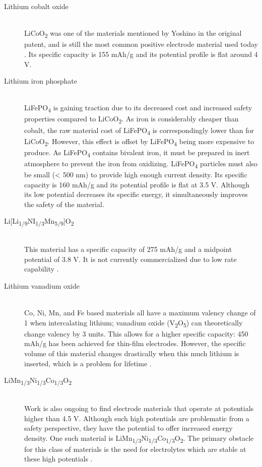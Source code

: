 \documentclass[12pt]{article} %
\begin{document}
\begin{description} %

\item[Lithium cobalt oxide] \hfill \\
LiCoO\textsubscript{2} was one of the materials mentioned by Yoshino in the original patent, and is still the most common positive electrode material used today \cite{yoshino_secondary_1987}.
Its specific capacity is 155 mAh/g and its potential profile is flat around 4 V.

\item[Lithium iron phosphate] \hfill \\
LiFePO\textsubscript{4} is gaining traction due to its decreased cost and increased safety properties compared to LiCoO\textsubscript{2}.
As iron is considerably cheaper than cobalt, the raw material cost of LiFePO\textsubscript{4} is correspondingly lower than for LiCoO\textsubscript{2}.
However, this effect is offset by LiFePO\textsubscript{4} being more expensive to produce.
As LiFePO\textsubscript{4} contains bivalent iron, it must be prepared in inert atmosphere to prevent the iron from oxidizing.
LiFePO\textsubscript{4} particles must also be small (< 500 nm) to provide high enough current density.
Its specific capacity is 160 mAh/g and its potential profile is flat at 3.5 V.
Although its low potential decreases its specific energy, it simultaneously improves the safety of the material.

\item[{Li[Li\textsubscript{1/9}NI\textsubscript{1/3}Mn\textsubscript{5/9}]O\textsubscript{2}}] \hfill \\
This material has a specific capacity of 275 mAh/g and a midpoint potential of 3.8 V.
It is not currently commercialized due to low rate capability \cite{reddy_thomas_section_2011-1}.

\item[Lithium vanadium oxide] \hfill \\
Co, Ni, Mn, and Fe based materials all have a maximum valency change of 1 when intercalating lithium; vanadium oxide (V\textsubscript{2}O\textsubscript{5}) can theoretically change valency by 3 units.
This allows for a higher specific capacity: 450 mAh/g has been achieved for thin-film electrodes.
However, the specific volume of this material changes drastically when this much lithium is inserted, which is a problem for lifetime \cite{kulova_new_2013}.

\item[LiMn\textsubscript{1/3}Ni\textsubscript{1/3}Co\textsubscript{1/3}O\textsubscript{2}] \hfill \\
Work is also ongoing to find electrode materials that operate at potentials higher than 4.5 V.
Although such high potentials are problematic from a safety perspective, they have the potential to offer increased energy density.
One such material is LiMn\textsubscript{1/3}Ni\textsubscript{1/3}Co\textsubscript{1/3}O\textsubscript{2}.
The primary obstacle for this class of materials is the need for electrolytes which are stable at these high potentials \cite{kulova_new_2013}.

\end{description} 
\end{document}
